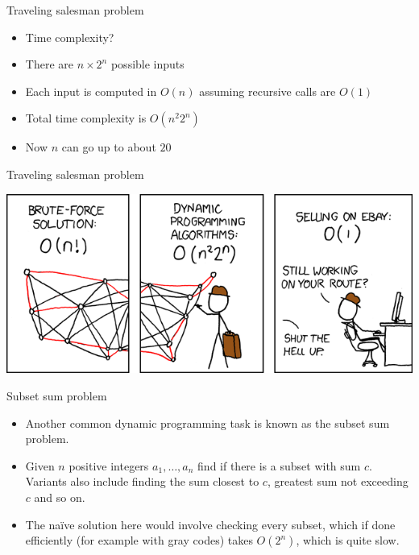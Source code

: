 \documentclass{beamer}
\begin{document}
\begin{frame}[plain]{Traveling salesman problem}
    \vspace{30pt}
    \begin{itemize}
        \item Time complexity?
        \vspace{10pt}
        \item There are $n \times 2^n$ possible inputs
        \item Each input is computed in $O(n)$ assuming recursive calls are $O(1)$
        \item Total time complexity is $O(n^2 2^n)$
            \vspace{10pt}
        \item Now $n$ can go up to about $20$
    \end{itemize}
\end{frame}

\begin{frame}{Traveling salesman problem}
    \vspace{40pt}
    \begin{center}
    \includegraphics[scale=0.4]{tsp.png}
    \end{center}
\end{frame}


\begin{frame}[plain]{Subset sum problem}
    \vspace{10pt}

    \begin{itemize}
        \item Another common dynamic programming task is known as the subset sum problem. 
        
        \item Given $n$ positive integers $a_1, \dots, a_n$ find if there is a subset with sum $c$. Variants also include finding the sum closest to $c$, greatest sum not exceeding $c$ and so on.
        
        \item The naïve solution here would involve checking every subset, which if done efficiently (for example with gray codes) takes $O(2^n)$, which is quite slow.
    \end{itemize}
\end{frame}
\end{document}
